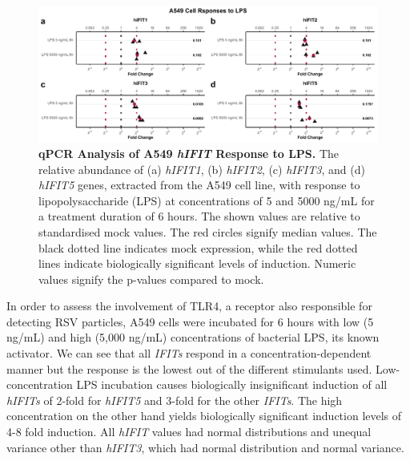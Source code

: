 \begin{figure}
    \centering
    \includegraphics[width=1\linewidth]{06. Chapter 1/Figs/01. Induction/03. a549_treat_lps.pdf}
    \caption[qPCR Analysis of A549 \textit{hIFIT} Response to LPS.]{\textbf{qPCR Analysis of A549 \textit{hIFIT} Response to LPS.} The relative abundance of (a) \textit{hIFIT1}, (b) \textit{hIFIT2}, (c) \textit{hIFIT3}, and (d) \textit{hIFIT5} genes, extracted from the A549 cell line, with response to lipopolysaccharide (LPS) at concentrations of 5 and 5000 ng/mL for a treatment duration of 6 hours. The shown values are relative to standardised mock values. The red circles signify median values. The black dotted line indicates mock expression, while the red dotted lines indicate biologically significant levels of induction. Numeric values signify the p-values compared to mock.}
    \label{A549 Response to LPS}
\end{figure}

In order to assess the involvement of TLR4, a receptor also responsible for detecting RSV particles, A549 cells were incubated for 6 hours with low (5 ng/mL) and high (5,000 ng/mL) concentrations of bacterial LPS, its known activator. We can see that all \textit{IFITs} respond in a concentration-dependent manner but the response is the lowest out of the different stimulants used. Low-concentration LPS incubation causes biologically insignificant induction of all \textit{hIFITs} of 2-fold for \textit{hIFIT5} and 3-fold for the other \textit{IFITs}. The high concentration on the other hand yields biologically significant induction levels of 4-8 fold induction. All \textit{hIFIT} values had normal distributions and unequal variance other than \textit{hIFIT3}, which had normal distribution and normal variance.

